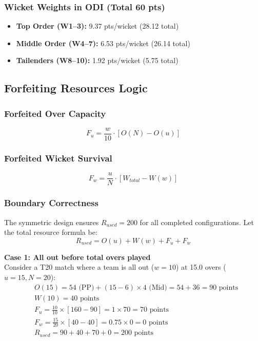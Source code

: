 \documentclass[12pt, letterpaper, fleqn]{article}
\begin{document}
\subsubsection{Wicket Weights in ODI (Total 60 pts)}
\begin{itemize}
    \item \textbf{Top Order (W1--3):} 9.37 pts/wicket (28.12 total)
    \item \textbf{Middle Order (W4--7):} 6.53 pts/wicket (26.14 total)
    \item \textbf{Tailenders (W8--10):} 1.92 pts/wicket (5.75 total)
\end{itemize}

\subsection{Forfeiting Resources Logic}

\subsubsection{Forfeited Over Capacity}
\begin{equation}
F_u = \frac{w}{10} \cdot [O(N) - O(u)]
\end{equation}

\subsubsection{Forfeited Wicket Survival}
\begin{equation}
F_w = \frac{u}{N} \cdot [W_{total} - W(w)]
\end{equation}

\subsubsection{Boundary Correctness}
\indent The symmetric design ensures $R_{used} = 200$ for all completed configurations. Let the total resource formula be:
\begin{equation}
R_{used} = O(u) + W(w) + F_u + F_w
\end{equation}

\vspace{1em}
\noindent \textbf{Case 1: All out before total overs played} \\
\indent Consider a T20 match where a team is all out ($w=10$) at 15.0 overs ($u=15, N=20$):
\begin{align*}
& O(15) = 54 \text{ (PP)} + (15-6) \times 4 \text{ (Mid)} = 54 + 36 = 90 \text{ points} \\
& W(10) = 40 \text{ points} \\
& F_u = \frac{10}{10} \times [160 - 90] = 1 \times 70 = 70 \text{ points} \\
& F_w = \frac{15}{20} \times [40 - 40] = 0.75 \times 0 = 0 \text{ points} \\
& R_{used} = 90 + 40 + 70 + 0 = 200 \text{ points}
\end{align*}
\end{document}

